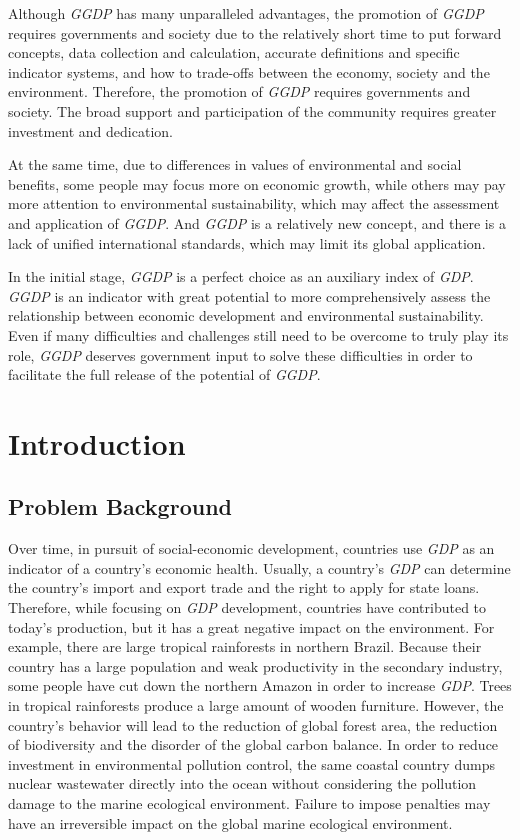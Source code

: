 \documentclass[12pt]{article}
\begin{document}
	Although \textit{GGDP} has many unparalleled advantages, the promotion of \textit{GGDP} requires governments and society due to the relatively short time to put forward concepts, data collection and calculation, accurate definitions and specific indicator systems, and how to trade-offs between the economy, society and the environment.
	Therefore, the promotion of \textit{GGDP} requires governments and society.
	The broad support and participation of the community requires greater investment and dedication.
	
	At the same time, due to differences in values of environmental and social benefits, some people may focus more on economic growth, while others may pay more attention to environmental sustainability, which may affect the assessment and application of \textit{GGDP}.
	And \textit{GGDP} is a relatively new concept, and there is a lack of unified international standards, which may limit its global application.
	
	In the initial stage, \textit{GGDP} is a perfect choice as an auxiliary index of \textit{GDP}.
	\textit{GGDP} is an indicator with great potential to more comprehensively assess the relationship between economic development and environmental sustainability.
	Even if many difficulties and challenges still need to be overcome to truly play its role, \textit{GGDP} deserves government input to solve these difficulties in order to facilitate the full release of the potential of \textit{GGDP}.
	
	\newpage
	
	\section{Introduction} %
	\subsection{Problem Background} %
	Over time, in pursuit of social-economic development, countries use \textit{GDP} as an indicator of a country's economic health. Usually, a country's \textit{GDP} can determine the country's import and export trade and the right to apply for state loans.
	Therefore, while focusing on \textit{GDP} development, countries have contributed to today's production, but it has a great negative impact on the environment.
	For example, there are large tropical rainforests in northern Brazil. Because their country has a large population and weak productivity in the secondary industry, some people have cut down the northern Amazon in order to increase \textit{GDP}.
	Trees in tropical rainforests produce a large amount of wooden furniture.
	However, the country's behavior will lead to the reduction of global forest area, the reduction of biodiversity and the disorder of the global carbon balance.
	In order to reduce investment in environmental pollution control, the same coastal country dumps nuclear wastewater directly into the ocean without considering the pollution damage to the marine ecological environment.
	Failure to impose penalties may have an irreversible impact on the global marine ecological environment.
	
\end{document}
